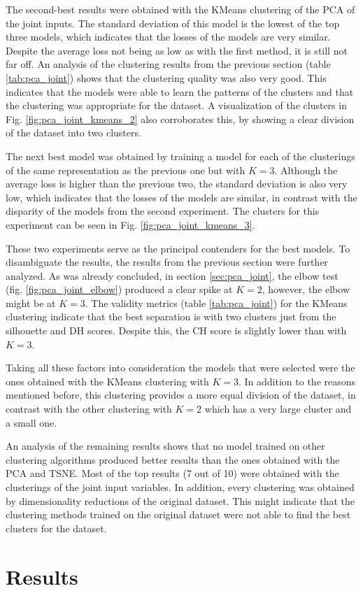 The second-best results were obtained with the KMeans clustering of the PCA of the joint inputs. The standard deviation of this model is the lowest of the top three models, which indicates that the losses of the models are very similar. Despite the average loss not being as low as with the first method, it is still not far off. An analysis of the clustering results from the previous section (table \ref{tab:pca_joint}) shows that the clustering quality was also very good. This indicates that the models were able to learn the patterns of the clusters and that the clustering was appropriate for the dataset. A visualization of the clusters in Fig. \ref{fig:pca_joint_kmeans_2} also corroborates this, by showing a clear division of the dataset into two clusters.

The next best model was obtained by training a model for each of the clusterings of the same representation as the previous one but with $K=3$. Although the average loss is higher than the previous two, the standard deviation is also very low, which indicates that the losses of the models are similar, in contrast with the disparity of the models from the second experiment. The clusters for this experiment can be seen in Fig. \ref{fig:pca_joint_kmeans_3}.

These two experiments serve as the principal contenders for the best models. To disambiguate the results, the results from the previous section were further analyzed. As was already concluded, in section \ref{sec:pca_joint}, the elbow test (fig. \ref{fig:pca_joint_elbow}) produced a clear spike at $K=2$, however, the elbow might be at $K=3$. The validity metrics (table \ref{tab:pca_joint}) for the KMeans clustering indicate that the best separation is with two clusters just from the silhouette and DH scores. Despite this, the CH score is slightly lower than with $K=3$. 

Taking all these factors into consideration the models that were selected were the ones obtained with the KMeans clustering with $K=3$. In addition to the reasons mentioned before, this clustering provides a more equal division of the dataset, in contrast with the other clustering with $K=2$ which has a very large cluster and a small one.

An analysis of the remaining results shows that no model trained on other clustering algorithms produced better results than the ones obtained with the PCA and TSNE. Most of the top results (7 out of 10) were obtained with the clusterings of the joint input variables. In addition, every clustering was obtained by dimensionality reductions of the original dataset. This might indicate that the clustering methods trained on the original dataset were not able to find the best clusters for the dataset. 

\section{Results}\label{sec:clustering_results}
